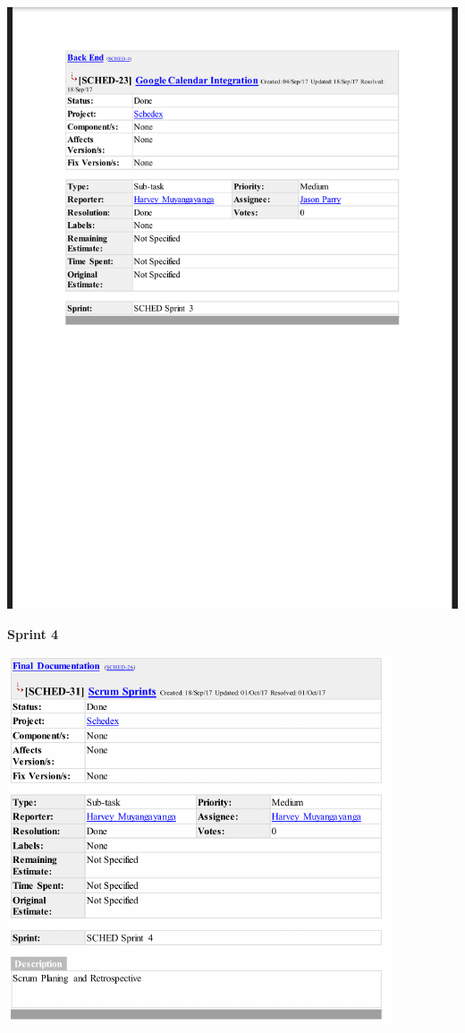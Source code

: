\documentclass{article}
\begin{document}
\centerline{\includegraphics[scale=0.4]{sprint3_6}}

\textbf{Sprint 4}

\centerline{\includegraphics[scale=1]{sprint4_1}}
\end{document}
